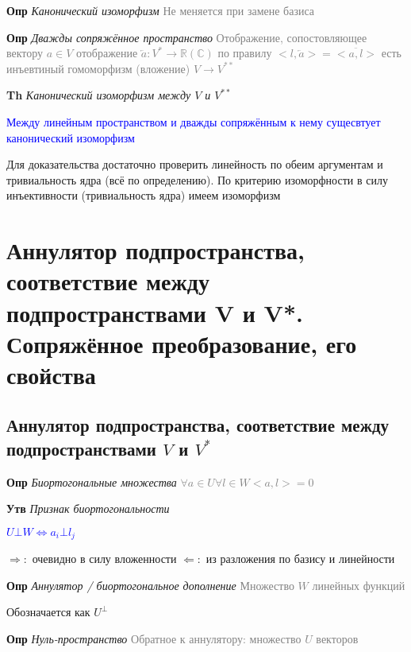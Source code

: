 \documentclass[a4paper, 14pt]{article}
\begin{document}
    \textbf{Опр} \textit{Канонический изоморфизм} \textcolor{gray}{Не меняется при замене базиса}
    
    \textbf{Опр} \textit{Дважды сопряжённое пространство} \textcolor{gray}{Отображение, сопостовляющее
    вектору $a \in V$ отображение $\overleftarrow{a}: V^* \rightarrow \mathbb{R} (\mathbb{C})$ по
    правилу $<l, \overleftarrow{a}> = \overline{<a, l>}$ есть инъевтиный гомоморфизм (вложение) $V \rightarrow V^{**}$}
    
    \textbf{Th} \textit{Канонический изоморфизм между $V$ и $V^{**}$}
    
    \textcolor{blue}{Между линейным пространством и дважды сопряжённым к нему сущесвтует канонический изоморфизм}
    
    Для доказательства достаточно проверить линейность по обеим аргументам и тривиальность ядра (всё по
    определению).
    По критерию изоморфности в силу инъективности (тривиальность ядра) имеем изоморфизм
    
    \section{Аннулятор подпространства, соответствие между подпространствами V и V*.
    Сопряжённое преобразование, его свойства}
    
    \subsection{Аннулятор подпространства, соответствие между подпространствами $V$ и $V^*$}
    
    \textbf{Опр} \textit{Биортогональные множества} \textcolor{gray}{$\forall a \in U \forall l \in W <a, l> = 0$}
    
    \textbf{Утв} \textit{Признак биортогональности}
    
    \textcolor{blue}{$U \bot W \Leftrightarrow a_i \bot l_j$}
    
    $\Rightarrow:$ очевидно в силу вложенности
    $\Leftarrow:$ из разложения по базису и линейности
    
    \textbf{Опр} \textit{Аннулятор / биортогональное дополнение} \textcolor{gray}{Множество $W$ линейных функций}
    
    Обозначается как $U^\bot$

    
    \textbf{Опр} \textit{Нуль-пространство} \textcolor{gray}{Обратное к аннулятору: множество $U$ векторов}
\end{document}
